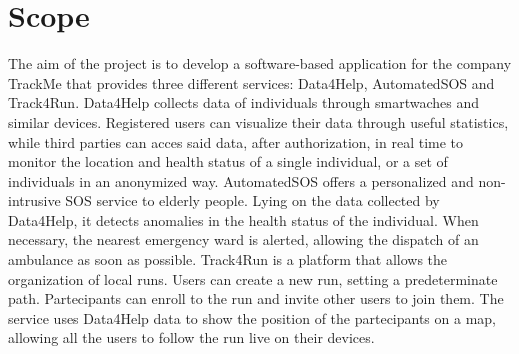 \section{Scope}
The aim of the project is to develop a software-based application for the company TrackMe that
provides three different services: Data4Help, AutomatedSOS and Track4Run.
Data4Help collects data of individuals through smartwaches and similar devices. Registered users can
visualize their data through useful statistics, while third parties can acces said data, after authorization,
in real time to monitor the location and health status of a single individual, or a set of individuals in an
anonymized way.
AutomatedSOS offers a personalized and non-intrusive SOS service to elderly people. Lying on the
data collected by Data4Help, it detects anomalies in the health status of the individual. When
necessary, the nearest emergency ward is alerted, allowing the dispatch of an ambulance as soon as
possible.
Track4Run is a platform that allows the organization of local runs. Users can create a new run, setting
a predeterminate path. Partecipants can enroll to the run and invite other users to join them. The
service uses Data4Help data to show the position of the partecipants on a map, allowing all the users
to follow the run live on their devices.